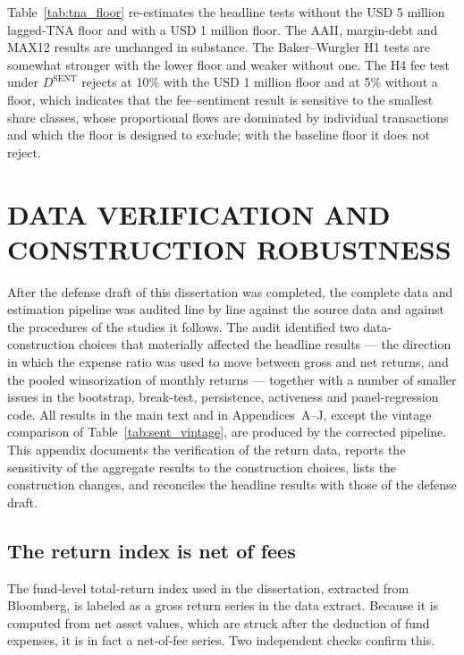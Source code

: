 \documentclass[12pt, oneside]{report}
\begin{document}


Table~\ref{tab:tna_floor} re-estimates the headline tests without the
USD 5 million lagged-TNA floor and with a USD 1 million floor. The AAII,
margin-debt and MAX12 results are unchanged in substance. The
Baker--Wurgler H1 tests are somewhat stronger with the lower floor and
weaker without one. The H4 fee test under $D^{\text{SENT}}$ rejects at
10\% with the USD 1 million floor and at 5\% without a floor, which
indicates that the fee--sentiment result is sensitive to the smallest
share classes, whose proportional flows are dominated by individual
transactions and which the floor is designed to exclude; with the
baseline floor it does not reject.



\chapter{DATA VERIFICATION AND CONSTRUCTION ROBUSTNESS}
\label{app:data_robustness}

\noindent After the defense draft of this dissertation was completed, the
complete data and estimation pipeline was audited line by line against
the source data and against the procedures of the studies it follows.
The audit identified two data-construction choices that materially
affected the headline results --- the direction in which the expense
ratio was used to move between gross and net returns, and the pooled
winsorization of monthly returns --- together with a number of smaller
issues in the bootstrap, break-test, persistence, activeness and
panel-regression code. All results in the main text and in
Appendices~A--J, except the vintage comparison of
Table~\ref{tab:sent_vintage}, are produced by the corrected pipeline. This appendix
documents the verification of the return data, reports the sensitivity
of the aggregate results to the construction choices, lists the
construction changes, and reconciles the headline results with those of
the defense draft.

\section{The return index is net of fees}
\label{sec:k_netindex}

\noindent The fund-level total-return index used in the dissertation, extracted
from Bloomberg, is labeled as a gross return series in the data extract. Because it is
computed from net asset values, which are struck after the deduction of
fund expenses, it is in fact a net-of-fee series. Two independent checks
confirm this.
\end{document}
